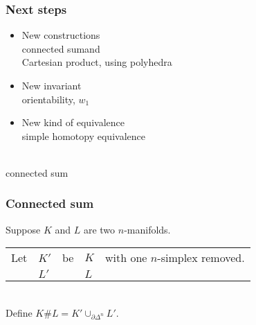 \documentclass[14pt]{beamer}
\newcommand{\boundary}{\partial}
\newcommand{\setbackgroundpicture}[1]{%
\usebackgroundtemplate{
\begin{pgfpicture}{0in}{0in}{\paperwidth}{\paperheight}
\pgfputat{\pgfxy(0,0)}{\texttt{[image: \#1]}}
\color{white}
\pgfsetfillopacity{0.8}
\pgfrect[fill]{\pgfxy(0,0)}{\pgfpoint{\paperwidth}{\paperheight}}
\end{pgfpicture}
}
}
\newcommand{\clearbackgroundpicture}{\usebackgroundtemplate{}}
\begin{document}
\setbackgroundpicture{Stair10.jpg}
\begin{frame}
  \frametitle{Next steps}
  \pause
  \begin{itemize}
   \item New constructions \pause\\
     \textcolor{green!50!black}{connected sum}\pause and \\
      \textcolor{green!50!black}{Cartesian product}, using polyhedra \pause \\
    \item New invariant \pause\\
      \textcolor{green!50!black}{orientability, $w_1$}\pause
    \item New kind of equivalence \pause\\
      \textcolor{green!50!black}{simple homotopy equivalence}
 \end{itemize}

\end{frame}
\clearbackgroundpicture


\begin{frame}
  \vfill
  \begin{center}
    \scalebox{5}{\Huge $\#$} \\
   \vspace{2ex}\hspace{-2em}connected sum
  \end{center}
  \vfill
\end{frame}

\begin{frame}
  \frametitle{Connected sum}

  \begin{definition}
  Suppose $K$ and $L$ are two $n$-manifolds. \\
  \vspace{1ex}%
  \begin{tabular}{@{}l@{ }l@{ }l@{ }l@{ }l}
  Let & $K'$ & be & $K$ & with one $n$-simplex removed. \\
   & $L'$ &  & $L$ &
  \end{tabular} \\
  \vspace{1ex}Define $K \# L = K' \cup_{\boundary \Delta^n} L'$.
\end{definition}

\vfill
\begin{columns}
\begin{column}{0.5\textwidth}
\end{column}
\begin{column}{0.5\textwidth}
\end{column}
\end{columns}

\end{frame}
\end{document}
